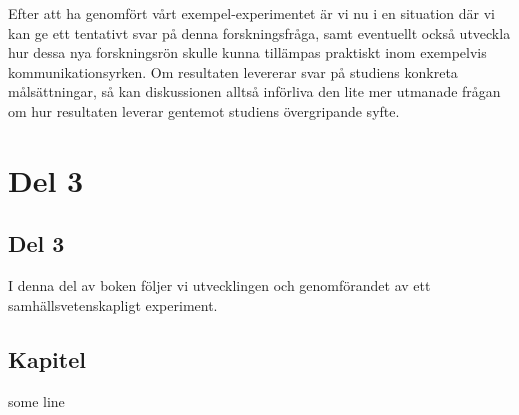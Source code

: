 \documentclass[
]{book}
\begin{document}
Efter att ha genomfört vårt exempel-experimentet är vi nu i en situation där vi kan ge ett tentativt svar på denna forskningsfråga, samt eventuellt också utveckla hur dessa nya forskningsrön skulle kunna tillämpas praktiskt inom exempelvis kommunikationsyrken. Om resultaten levererar svar på studiens konkreta målsättningar, så kan diskussionen alltså införliva den lite mer utmanade frågan om hur resultaten leverar gentemot studiens övergripande syfte.

\newpage

\hypertarget{part-del-3}{%
\part{Del 3}\label{part-del-3}}

\hypertarget{del-3}{%
\chapter*{Del 3}\label{del-3}}

I denna del av boken följer vi utvecklingen och genomförandet av ett samhällsvetenskapligt experiment.

\hypertarget{chap09}{%
\chapter{Kapitel}\label{chap09}}

some line

  
\end{document}
